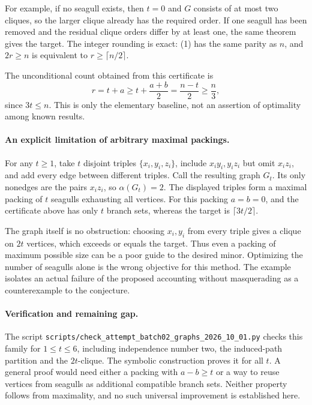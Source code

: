 \documentclass[11pt,a4paper]{article}
\begin{document}
For example, if no seagull exists, then $t=0$ and $G$ consists of at most two cliques, so the larger clique already has the required order. If one seagull has been removed and the residual clique orders differ by at least one, the same theorem gives the target. The integer rounding is exact: (1) has the same parity as $n$, and $2r\ge n$ is equivalent to $r\ge\lceil n/2\rceil$.

The unconditional count obtained from this certificate is
\[
 r=t+a\ge t+\frac{a+b}{2}=\frac{n-t}{2}\ge\frac n3,
\]
since $3t\le n$. This is only the elementary baseline, not an assertion of optimality among known results.

\paragraph{An explicit limitation of arbitrary maximal packings.}
For any $t\ge1$, take $t$ disjoint triples $\{x_i,y_i,z_i\}$, include $x_i y_i,y_i z_i$ but omit $x_i z_i$, and add every edge between different triples. Call the resulting graph $G_t$. Its only nonedges are the pairs $x_i z_i$, so $\alpha(G_t)=2$. The displayed triples form a maximal packing of $t$ seagulls exhausting all vertices. For this packing $a=b=0$, and the certificate above has only $t$ branch sets, whereas the target is $\lceil3t/2\rceil$.

The graph itself is no obstruction: choosing $x_i,y_i$ from every triple gives a clique on $2t$ vertices, which exceeds or equals the target. Thus even a packing of maximum possible size can be a poor guide to the desired minor. Optimizing the number of seagulls alone is the wrong objective for this method. The example isolates an actual failure of the proposed accounting without masquerading as a counterexample to the conjecture.

\paragraph{Verification and remaining gap.}
The script \texttt{scripts/check\_attempt\_batch02\_graphs\_2026\_10\_01.py} checks this family for $1\le t\le6$, including independence number two, the induced-path partition and the $2t$-clique. The symbolic construction proves it for all $t$. A general proof would need either a packing with $a-b\ge t$ or a way to reuse vertices from seagulls as additional compatible branch sets. Neither property follows from maximality, and no such universal improvement is established here.
\end{document}
